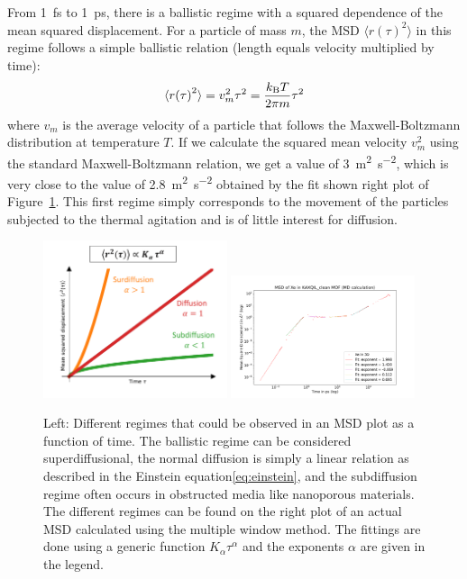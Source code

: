 \documentclass[main]{subfiles}
\begin{document}
From \SI{1}{\fs} to \SI{1}{\ps}, there is a ballistic regime with a squared dependence of the mean squared displacement. For a particle of mass $m$, the MSD $\langle {r(\tau)}^2 \rangle$ in this regime follows a simple ballistic relation (length equals velocity multiplied by time):
\begin{equation}
  \langle {r(\tau)}^2 \rangle = v_m^2 \tau^2 = \frac{k_{\text{B}}T}{2\pi m}\tau^2
\end{equation}
where $v_m$ is the average velocity of a particle that follows the Maxwell-Boltzmann distribution at temperature $T$. If we calculate the squared mean velocity $v_m^2$ using the standard Maxwell-Boltzmann relation, we get a value of \SI{3}{\square\m\per\square\second}, which is very close to the value of \SI{2.8}{\square\m\per\square\second} obtained by the fit shown right plot of Figure~\ref{fgr:MSD_init}. This first regime simply corresponds to the movement of the particles subjected to the thermal agitation and is of little interest for diffusion. 

\begin{figure}[ht]
  \centering
    \includegraphics[width=0.48\textwidth]{figures/5-diffusion/MSD_anomalous_diffusion.pdf}
    \includegraphics[width=0.48\textwidth]{figures/5-diffusion/MSD_Xe_KAXQIL_clean.pdf}
    \caption{Left: Different regimes that could be observed in an MSD plot as a function of time. The ballistic regime can be considered superdiffusional, the normal diffusion is simply a linear relation as described in the Einstein equation\ref{eq:einstein}, and the subdiffusion regime often occurs in obstructed media like nanoporous materials. The different regimes can be found on the right plot of an actual MSD calculated using the multiple window method. The fittings are done using a generic function $K_\alpha\tau^\alpha$ and the exponents $\alpha$ are given in the legend. }\label{fgr:MSD_init}
\end{figure}
\end{document}
